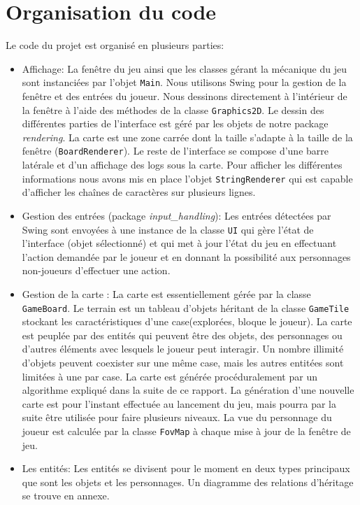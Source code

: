 \documentclass[10pt,a4paper]{article}
\begin{document}
\section{Organisation du code}
Le code du projet est organisé en plusieurs parties:
\begin{itemize}
    \item Affichage: La fenêtre du jeu ainsi que les classes gérant la mécanique du jeu sont instanciées par l'objet \texttt{Main}. Nous utilisons Swing pour la gestion de la fenêtre et des entrées du joueur. Nous dessinons directement à l'intérieur de la fenêtre à l'aide des méthodes de la classe \texttt{Graphics2D}. Le dessin des différentes parties de l'interface est géré par les objets de notre package \emph{rendering}. La carte est une zone carrée dont la taille s'adapte à la taille de la fenêtre (\texttt{BoardRenderer}). Le reste de l'interface se compose d'une barre latérale et d'un affichage des logs sous la carte. Pour afficher les différentes informations nous avons mis en place l'objet \texttt{StringRenderer} qui est capable d'afficher les chaînes de caractères sur plusieurs lignes.
    \item Gestion des entrées (package \emph{input\_handling}): Les entrées détectées par Swing sont envoyées à une instance de la classe \texttt{UI} qui gère l'état de l'interface (objet sélectionné) et qui met à jour l'état du jeu en effectuant l'action demandée par le joueur et en donnant la possibilité aux personnages non-joueurs d'effectuer une action.
    \item Gestion de la carte : La carte est essentiellement gérée par la classe \texttt{GameBoard}. Le terrain est un tableau d'objets héritant de la classe \texttt{GameTile} stockant les caractéristiques d'une case(explorées, bloque le joueur). La carte est peuplée par des entités qui peuvent être des objets, des personnages ou d'autres éléments avec lesquels le joueur peut interagir. Un nombre illimité d'objets peuvent coexister sur une même case, mais les autres entitées sont limitées à une par case. La carte est générée procéduralement par un algorithme expliqué dans la suite de ce rapport. La génération d'une nouvelle carte est pour l'instant effectuée au lancement du jeu, mais pourra par la suite être utilisée pour faire plusieurs niveaux. La vue du personnage du joueur est calculée par la classe \texttt{FovMap} à chaque mise à jour de la fenêtre de jeu.
    \item Les entités: Les entités se divisent pour le moment en deux types principaux que sont les objets et les personnages. Un diagramme des relations d'héritage se trouve en annexe.

\end{itemize}
\end{document}
